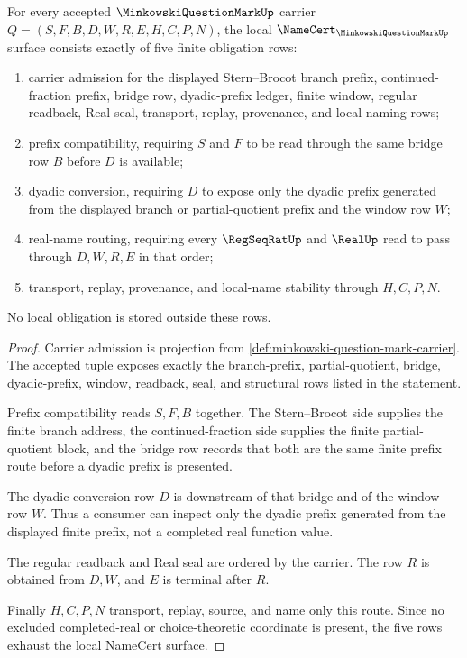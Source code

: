 \begin{theorem}
\label{thm:minkowski-question-mark-namecert-obligations}
For every accepted $\MinkowskiQuestionMarkUp$ carrier $Q=(S,F,B,D,W,R,E,H,C,P,N)$, the local $\NameCert_{\MinkowskiQuestionMarkUp}$ surface consists exactly of five finite obligation rows:
\begin{enumerate}
\item carrier admission for the displayed Stern--Brocot branch prefix, continued-fraction prefix, bridge row, dyadic-prefix ledger, finite window, regular readback, Real seal, transport, replay, provenance, and local naming rows;
\item prefix compatibility, requiring $S$ and $F$ to be read through the same bridge row $B$ before $D$ is available;
\item dyadic conversion, requiring $D$ to expose only the dyadic prefix generated from the displayed branch or partial-quotient prefix and the window row $W$;
\item real-name routing, requiring every $\RegSeqRatUp$ and $\RealUp$ read to pass through $D,W,R,E$ in that order;
\item transport, replay, provenance, and local-name stability through $H,C,P,N$.
\end{enumerate}
No local obligation is stored outside these rows.
\end{theorem}
\begin{proof}
Carrier admission is projection from \autoref{def:minkowski-question-mark-carrier}. The accepted tuple exposes exactly the branch-prefix, partial-quotient, bridge, dyadic-prefix, window, readback, seal, and structural rows listed in the statement.

Prefix compatibility reads $S,F,B$ together. The Stern--Brocot side supplies the finite branch address, the continued-fraction side supplies the finite partial-quotient block, and the bridge row records that both are the same finite prefix route before a dyadic prefix is presented.

The dyadic conversion row $D$ is downstream of that bridge and of the window row $W$. Thus a consumer can inspect only the dyadic prefix generated from the displayed finite prefix, not a completed real function value.

The regular readback and Real seal are ordered by the carrier. The row $R$ is obtained from $D,W$, and $E$ is terminal after $R$.

Finally $H,C,P,N$ transport, replay, source, and name only this route. Since no excluded completed-real or choice-theoretic coordinate is present, the five rows exhaust the local NameCert surface.
\end{proof}

